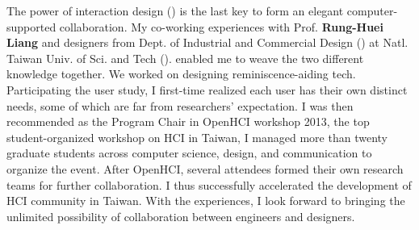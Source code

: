 The power of interaction design () is the last key to form an elegant computer-supported collaboration. 
My co-working experiences with Prof. \textbf{Rung-Huei Liang} and 
designers from Dept. of Industrial and Commercial Design () at Natl. Taiwan Univ. of Sci. and Tech (). 
enabled me to weave the two different knowledge together. 
We worked on designing reminiscence-aiding tech. 
Participating the user study, I first-time realized each user has their own distinct needs, 
some of which are far from researchers’ expectation. 
I was then recommended as the Program Chair in OpenHCI workshop 2013, 
the top student-organized workshop on HCI in Taiwan, 
I managed more than twenty graduate students across computer science, design, and communication to organize the event. 
After OpenHCI, several attendees formed their own research teams for further collaboration. 
I thus successfully accelerated the development of HCI community in Taiwan. 
With the experiences, I look forward to bringing the unlimited possibility of collaboration between engineers and designers.


